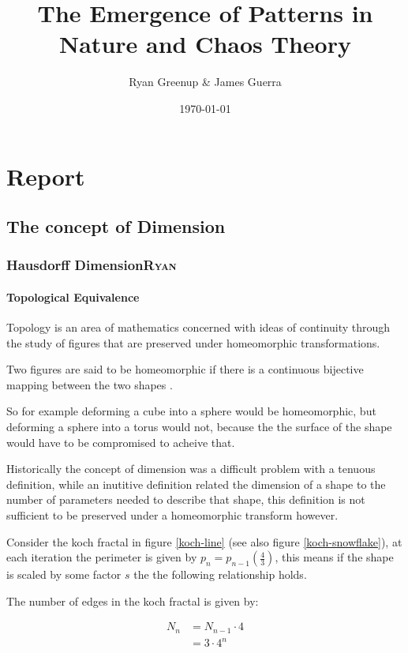 \documentclass[11pt]{article}
\author{Ryan Greenup \& James Guerra}
\date{\today}
\title{The Emergence of Patterns in Nature and Chaos Theory}
\begin{document}
\maketitle
\tableofcontents

\section{Report}
\label{sec:org237a216}
\subsection{The concept of Dimension}
\label{sec:org23f67da}
\subsubsection{Hausdorff Dimension\hfill{}\textsc{Ryan}}
\label{sec:org1e3ec6b}
\paragraph{Topological Equivalence}
\label{sec:org35d3ef2}
Topology is an area of mathematics concerned with ideas of continuity through the study of figures that are preserved under homeomorphic transformations. \cite{gilmoreTopologyChaosAlice2002}

Two figures are said to be homeomorphic if there is a continuous bijective mapping between the two shapes \cite[p. 105]{peitgenChaosFractalsNew2004}.

So for example deforming a cube into a sphere would be homeomorphic, but deforming a sphere into a torus would not, because the the surface of the shape would have to be compromised to acheive that.

Historically the concept of dimension was a difficult problem with a tenuous
definition, while an inutitive definition related the dimension of a shape to
the number of parameters needed to describe that shape, this definition is not
sufficient to be preserved under a homeomorphic transform however.

Consider the koch fractal in figure \ref{koch-line} (see also figure \ref{koch-snowflake}), at each iteration the perimeter is given by \(p_{n}=p_{n-1}  \left(\frac{4}{3} \right)\), this means if the shape is scaled by some factor \(s\) the the following relationship holds.

The number of edges in the koch fractal is given by:

\begin{align}
N_{n} &= N_{n-1} \cdot 4 \\
&= 3 \cdot 4^{n}
\end{align}
\end{document}
